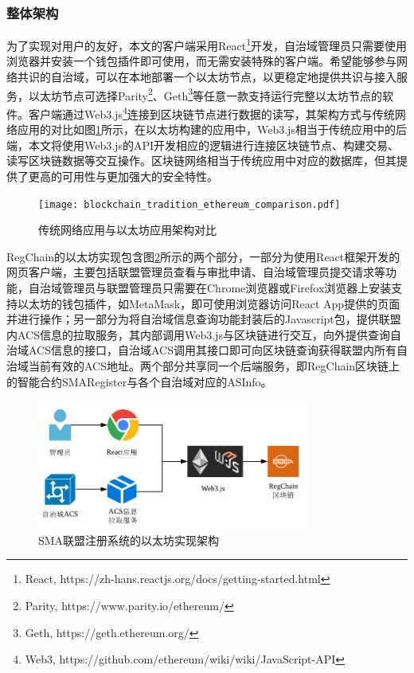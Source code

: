       \subsubsection{整体架构}
      \label{IPv6_Security:interas:implement:architecture}
      为了实现对用户的友好，本文的客户端采用React\footnote{React, https://zh-hans.reactjs.org/docs/getting-started.html}开发，自治域管理员只需要使用浏览器并安装一个钱包插件即可使用，而无需安装特殊的客户端。希望能够参与网络共识的自治域，可以在本地部署一个以太坊节点，以更稳定地提供共识与接入服务，以太坊节点可选择Parity\footnote{Parity, https://www.parity.io/ethereum/}、Geth\footnote{Geth, https://geth.ethereum.org/}等任意一款支持运行完整以太坊节点的软件。客户端通过Web3.js\footnote{Web3, https://github.com/ethereum/wiki/wiki/JavaScript-API}连接到区块链节点进行数据的读写，其架构方式与传统网络应用的对比如图\ref{fig:blockchain_tradition_ethereum_comparison}所示，在以太坊构建的应用中，Web3.js相当于传统应用中的后端，本文将使用Web3.js的API开发相应的逻辑进行连接区块链节点、构建交易、读写区块链数据等交互操作。区块链网络相当于传统应用中对应的数据库，但其提供了更高的可用性与更加强大的安全特性。

      \begin{figure}[ht]
        \centering
        \texttt{[image: blockchain\_tradition\_ethereum\_comparison.pdf]}
        \caption{传统网络应用与以太坊应用架构对比}
        \label{fig:blockchain_tradition_ethereum_comparison}
      \end{figure}

      RegChain的以太坊实现包含图\ref{fig:blockchain_regchain_implementation}所示的两个部分，一部分为使用React框架开发的网页客户端，主要包括联盟管理员查看与审批申请、自治域管理员提交请求等功能，自治域管理员与联盟管理员只需要在Chrome浏览器或Firefox浏览器上安装支持以太坊的钱包插件，如MetaMask，即可使用浏览器访问React App提供的页面并进行操作；另一部分为将自治域信息查询功能封装后的Javascript包，提供联盟内ACS信息的拉取服务，其内部调用Web3.js与区块链进行交互，向外提供查询自治域ACS信息的接口，自治域ACS调用其接口即可向区块链查询获得联盟内所有自治域当前有效的ACS地址。两个部分共享同一个后端服务，即RegChain区块链上的智能合约SMARegister与各个自治域对应的ASInfo。
      
      \begin{figure}[ht]
        \centering
        \includegraphics[width=0.8\textwidth]{figures/blockchain_regchain_implementation.png}
        \caption{SMA联盟注册系统的以太坊实现架构}
        \label{fig:blockchain_regchain_implementation}
      \end{figure}

